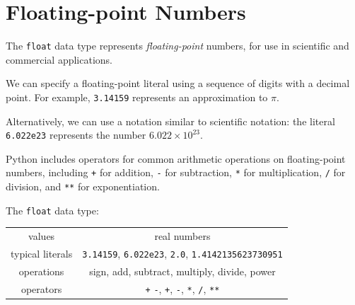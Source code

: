 \documentclass[8pt,a4paper,compress,handout]{beamer}
\begin{document}
\section{Floating-point Numbers}
\begin{frame}[fragile]
The \lstinline{float} data type represents \emph{floating-point} numbers, for use in scientific and commercial applications.

\bigskip

We can specify a floating-point literal using a sequence of digits with a decimal point. For example, \lstinline{3.14159} represents an approximation to $\pi$.

\bigskip

Alternatively, we can use a notation similar to scientific notation: the literal \lstinline{6.022e23} represents the number $6.022 \times 10^{23}$.

\bigskip

Python includes operators for common arithmetic operations on floating-point numbers, including \lstinline{+} for addition, \lstinline{-} for subtraction, \lstinline{*} for multiplication, \lstinline{/} for division, and \lstinline{**} for exponentiation.

\bigskip

The \lstinline{float} data type:

\begin{center}
\begin{tabular}{c|c}
values & real numbers \\
typical literals & \lstinline$3.14159$, \lstinline$6.022e23$, \lstinline$2.0$, \lstinline$1.4142135623730951$ \\ 
operations & sign, add, subtract, multiply, divide, power \\
operators & \lstinline$+$ \lstinline$-$, \lstinline$+$, \lstinline$-$, \lstinline$*$, \lstinline$/$, \lstinline$**$
\end{tabular} 
\end{center}
\end{frame}
\end{document}
